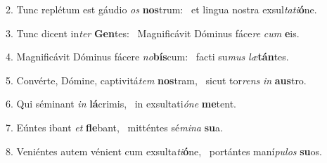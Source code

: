 2. Tunc replétum est gáudio \textit{os} \textbf{nos}trum: \ast\  et lingua nostra exsul\textit{ta}\textit{ti}\textbf{ó}ne.\

3. Tunc dicent in\textit{ter} \textbf{Gen}tes: \ast\  Magnificávit Dóminus fáce\textit{re} \textit{cum} \textbf{e}is.\

4. Magnificávit Dóminus fácere \textit{no}\textbf{bís}cum: \ast\  facti su\textit{mus} \textit{læ}\textbf{tán}tes.\

5. Convérte, Dómine, captivitá\textit{tem} \textbf{nos}tram, \ast\  sicut tor\textit{rens} \textit{in} \textbf{aus}tro.\

6. Qui séminant \textit{in} \textbf{lá}crimis, \ast\  in exsultati\textit{ó}\textit{ne} \textbf{me}tent.\

7. Eúntes ibant \textit{et} \textbf{fle}bant, \ast\  mitténtes sé\textit{mi}\textit{na} \textbf{su}a.\

8. Veniéntes autem vénient cum exsulta\textit{ti}\textbf{ó}ne, \ast\  portántes maní\textit{pu}\textit{los} \textbf{su}os.\

